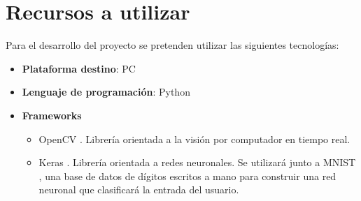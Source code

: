 \documentclass[12pt,spanish]{article}
\begin{document}
\section{Recursos a utilizar}

Para el desarrollo del proyecto se pretenden utilizar las siguientes tecnologías:
\begin{itemize}
	\item \textbf{Plataforma destino}: PC
	\item \textbf{Lenguaje de programación}: Python \cite{python}
	\item \textbf{Frameworks}
		\begin{itemize}
			\item OpenCV \cite{opencv}. Librería orientada a la visión por computador en tiempo real.
			\item Keras \cite{Keras}. Librería orientada a redes neuronales. Se utilizará junto a MNIST \cite{mnist}, una base de datos de dígitos escritos a mano para construir una red neuronal que clasificará la entrada del usuario.
		\end{itemize}
\end{itemize}


\newpage


\end{document}
